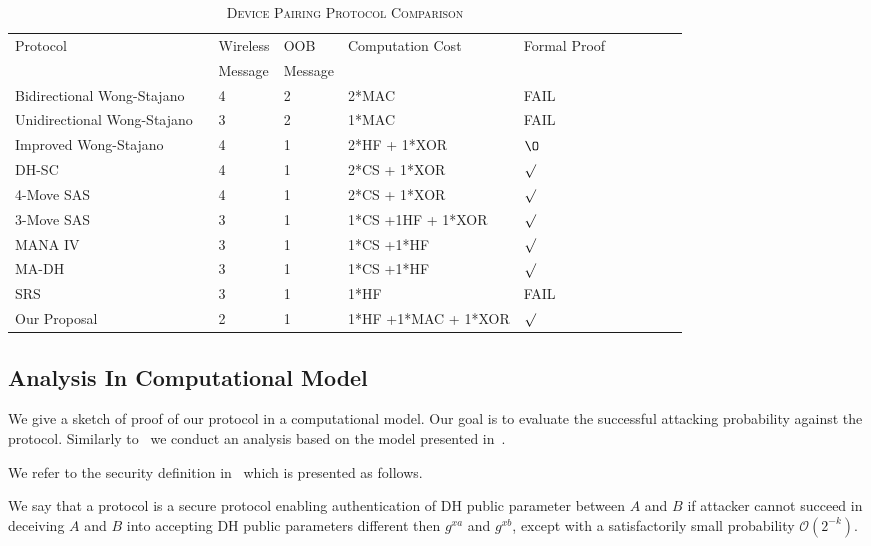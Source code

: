 \begin{enumerate}
\begin{enumerate}
\begin{table}[ht] 
\centering
\caption{\textsc{Device Pairing Protocol Comparison}}
\label{devcom}
{\scriptsize
\begin{tabular}{ p{5cm} l l l l l p{1cm} l p{1cm} l }
\hline
Protocol & Wireless & OOB & Computation Cost & Formal Proof \\
  & Message & Message & & \\
\hline\hline
Bidirectional Wong-Stajano ~\cite{10.1109/MPRV.2007.76} & 4 & 2 & 2*MAC & FAIL \\ \hline
Unidirectional Wong-Stajano ~\cite{10.1109/MPRV.2007.76} & 3 & 2 & 1*MAC & FAIL \\ \hline
Improved Wong-Stajano ~\cite{Nguyen09authenticationprotocols} & 4 & 1 & 2*HF + 1*XOR & $\O$ \\ \hline
DH-SC ~\cite{1580514} & 4 & 1 & 2*CS + 1*XOR & $\surd$ \\ \hline
4-Move SAS ~\cite{Vaudenay:2005qa} & 4 & 1 & 2*CS + 1*XOR & $\surd$ \\ \hline
3-Move SAS ~\cite{Vaudenay:2005qa} & 3 & 1 & 1*CS +1HF + 1*XOR & $\surd$ \\ \hline
MANA IV ~\cite{Laur:2006kl} & 3 & 1 & 1*CS +1*HF & $\surd$ \\ \hline
MA-DH ~\cite{Laur:2006kl} & 3 & 1 & 1*CS +1*HF & $\surd$ \\ \hline
SRS~\cite{5678019} &3 & 1 & 1*HF &FAIL \\ \hline 
Our Proposal & 2 & 1 & 1*HF +1*MAC + 1*XOR & $\surd$ \\ \hline
\end{tabular}
}
\end{table}

\subsection{Analysis In Computational Model}\label{proof-computational-model}

We give a sketch of proof of our protocol in a computational model. Our goal is to evaluate the successful attacking probability against the protocol. Similarly to~\cite{1580514} we conduct an analysis based on the model presented in~\cite{Bellare:1994aa}. 

We refer to the security definition in~\cite{1580514} which is presented as follows. 

\begin{Definition}
We say that a protocol is a secure protocol enabling authentication of DH public parameter between $A$ and $B$ if attacker cannot succeed in deceiving $A$ and $B$ into accepting DH public parameters different then $g^{xa}$ and $g^{xb}$, except with a satisfactorily small probability $\mathcal{O}(2^{-k})$.
\end{Definition}


\end{enumerate}
\end{enumerate}
